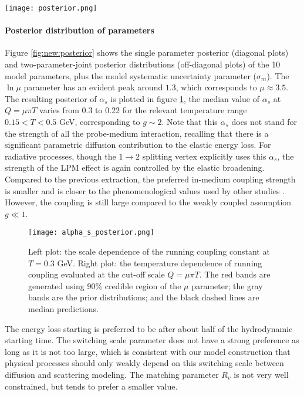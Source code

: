 \begin{figure*}
\centering
\texttt{[image: posterior.png]}
\caption{The single-parameter posterior distributions (diagonal plots) and two-parameter joint posterior distributions (off-diagonal plots).}
\label{fig:new:posterior}
\end{figure*}

\paragraph{Posterior distribution of parameters} Figure \ref{fig:new:posterior} shows the single parameter posterior (diagonal plots) and two-parameter-joint posterior distributions (off-diagonal plots) of the 10 model parameters, plus the model systematic uncertainty parameter ($\sigma_m$).
The $\ln\mu$ parameter has an evident peak around $1.3$, which corresponds to $\mu \approx 3.5$.
The resulting posterior of $\alpha_s$ is plotted in figure \ref{fig:new:posterior-alphas}, the median value of $\alpha_s$ at $Q=\mu\pi T$ varies from 0.3 to 0.22 for the relevant temperature range $0.15 < T < 0.5$ GeV, corresponding to $g\sim 2$.
Note that this $\alpha_s$ does not stand for the strength of all the probe-medium interaction, recalling that there is a significant parametric diffusion contribution to the elastic energy loss.
For radiative processes, though the $1\rightarrow 2$ splitting vertex explicitly uses this $\alpha_s$, the strength of the LPM effect is again controlled by the elastic broadening.
Compared to the previous extraction, the preferred in-medium coupling strength is smaller and is closer to the phenomenological values used by other studies \cite{Burke:2013yra}.
However, the coupling is still large compared to the weakly coupled assumption $g\ll 1$.

\begin{figure}
\centering
\texttt{[image: alpha\_s\_posterior.png]}
\caption{Left plot: the scale dependence of the running coupling constant at $T=0.3$ GeV. Right plot: the temperature dependence of running coupling evaluated at the cut-off scale $Q=\mu\pi T$. The red bands are generated using 90\% credible region of the $\mu$ parameter; the gray bands are the prior distributions; and the black dashed lines are median predictions.}
\label{fig:new:posterior-alphas}
\end{figure}

The energy loss starting is preferred to be after about half of the hydrodynamic starting time.
The switching scale parameter does not have a strong preference as long as it is not too large, which is consistent with our model construction that physical processes should only weakly depend on this switching scale between diffusion and scattering modeling.
The matching parameter $R_v$ is not very well constrained, but tends to prefer a smaller value.


